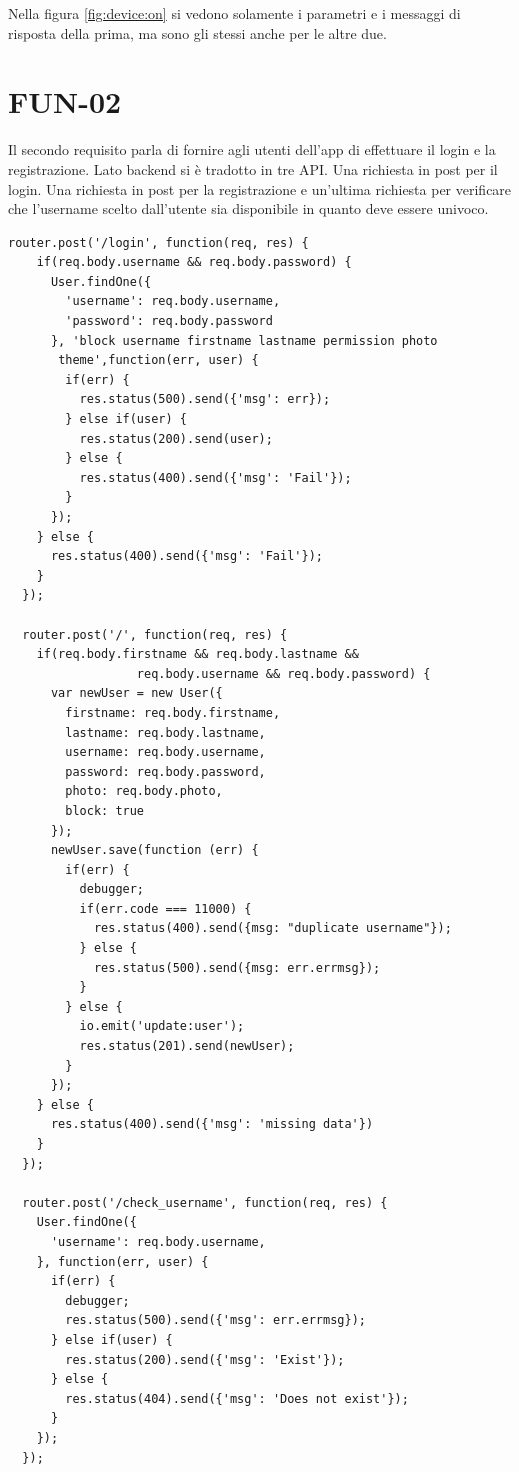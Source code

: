 Nella figura \ref{fig:device:on} si vedono solamente i parametri e i messaggi di risposta della prima, ma sono gli stessi anche per le altre due.

\section{FUN-02}
Il secondo requisito parla di fornire agli utenti dell'app di effettuare il login e la registrazione.
Lato backend si è tradotto in tre API.
Una richiesta in post per il login.
Una richiesta in post per la registrazione e un'ultima richiesta per verificare che l'username scelto dall'utente sia disponibile in quanto deve essere univoco. 

\begin{lstlisting}[caption={/webserver/app/routes/user.js login}, style=javaScriptCode]
  router.post('/login', function(req, res) {
    if(req.body.username && req.body.password) {
      User.findOne({
        'username': req.body.username,
        'password': req.body.password
      }, 'block username firstname lastname permission photo
       theme',function(err, user) {
        if(err) {
          res.status(500).send({'msg': err});
        } else if(user) {
          res.status(200).send(user);
        } else {
          res.status(400).send({'msg': 'Fail'});
        }
      });
    } else {
      res.status(400).send({'msg': 'Fail'});
    }
  });
  
  router.post('/', function(req, res) {
    if(req.body.firstname && req.body.lastname && 
                  req.body.username && req.body.password) {
      var newUser = new User({
        firstname: req.body.firstname,
        lastname: req.body.lastname,
        username: req.body.username,
        password: req.body.password,
        photo: req.body.photo,
        block: true
      });
      newUser.save(function (err) {
        if(err) {
          debugger;
          if(err.code === 11000) {
            res.status(400).send({msg: "duplicate username"});
          } else {
            res.status(500).send({msg: err.errmsg});
          }
        } else {
          io.emit('update:user');
          res.status(201).send(newUser);
        }
      });
    } else {
      res.status(400).send({'msg': 'missing data'})
    }
  });

  router.post('/check_username', function(req, res) {
    User.findOne({
      'username': req.body.username,
    }, function(err, user) {
      if(err) {
        debugger;
        res.status(500).send({'msg': err.errmsg});
      } else if(user) {
        res.status(200).send({'msg': 'Exist'});
      } else {
        res.status(404).send({'msg': 'Does not exist'});
      }
    });
  });
\end{lstlisting}

